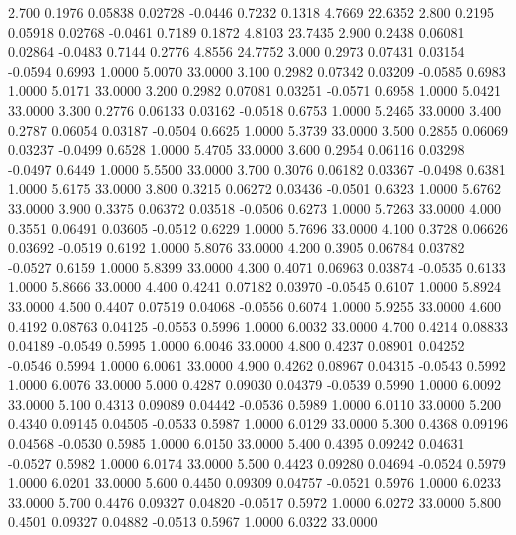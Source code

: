    2.700   0.1976   0.05838   0.02728  -0.0446   0.7232   0.1318   4.7669  22.6352
   2.800   0.2195   0.05918   0.02768  -0.0461   0.7189   0.1872   4.8103  23.7435
   2.900   0.2438   0.06081   0.02864  -0.0483   0.7144   0.2776   4.8556  24.7752
   3.000   0.2973   0.07431   0.03154  -0.0594   0.6993   1.0000   5.0070  33.0000
   3.100   0.2982   0.07342   0.03209  -0.0585   0.6983   1.0000   5.0171  33.0000
   3.200   0.2982   0.07081   0.03251  -0.0571   0.6958   1.0000   5.0421  33.0000
   3.300   0.2776   0.06133   0.03162  -0.0518   0.6753   1.0000   5.2465  33.0000
   3.400   0.2787   0.06054   0.03187  -0.0504   0.6625   1.0000   5.3739  33.0000
   3.500   0.2855   0.06069   0.03237  -0.0499   0.6528   1.0000   5.4705  33.0000
   3.600   0.2954   0.06116   0.03298  -0.0497   0.6449   1.0000   5.5500  33.0000
   3.700   0.3076   0.06182   0.03367  -0.0498   0.6381   1.0000   5.6175  33.0000
   3.800   0.3215   0.06272   0.03436  -0.0501   0.6323   1.0000   5.6762  33.0000
   3.900   0.3375   0.06372   0.03518  -0.0506   0.6273   1.0000   5.7263  33.0000
   4.000   0.3551   0.06491   0.03605  -0.0512   0.6229   1.0000   5.7696  33.0000
   4.100   0.3728   0.06626   0.03692  -0.0519   0.6192   1.0000   5.8076  33.0000
   4.200   0.3905   0.06784   0.03782  -0.0527   0.6159   1.0000   5.8399  33.0000
   4.300   0.4071   0.06963   0.03874  -0.0535   0.6133   1.0000   5.8666  33.0000
   4.400   0.4241   0.07182   0.03970  -0.0545   0.6107   1.0000   5.8924  33.0000
   4.500   0.4407   0.07519   0.04068  -0.0556   0.6074   1.0000   5.9255  33.0000
   4.600   0.4192   0.08763   0.04125  -0.0553   0.5996   1.0000   6.0032  33.0000
   4.700   0.4214   0.08833   0.04189  -0.0549   0.5995   1.0000   6.0046  33.0000
   4.800   0.4237   0.08901   0.04252  -0.0546   0.5994   1.0000   6.0061  33.0000
   4.900   0.4262   0.08967   0.04315  -0.0543   0.5992   1.0000   6.0076  33.0000
   5.000   0.4287   0.09030   0.04379  -0.0539   0.5990   1.0000   6.0092  33.0000
   5.100   0.4313   0.09089   0.04442  -0.0536   0.5989   1.0000   6.0110  33.0000
   5.200   0.4340   0.09145   0.04505  -0.0533   0.5987   1.0000   6.0129  33.0000
   5.300   0.4368   0.09196   0.04568  -0.0530   0.5985   1.0000   6.0150  33.0000
   5.400   0.4395   0.09242   0.04631  -0.0527   0.5982   1.0000   6.0174  33.0000
   5.500   0.4423   0.09280   0.04694  -0.0524   0.5979   1.0000   6.0201  33.0000
   5.600   0.4450   0.09309   0.04757  -0.0521   0.5976   1.0000   6.0233  33.0000
   5.700   0.4476   0.09327   0.04820  -0.0517   0.5972   1.0000   6.0272  33.0000
   5.800   0.4501   0.09327   0.04882  -0.0513   0.5967   1.0000   6.0322  33.0000
